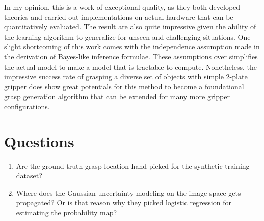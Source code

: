 \documentclass[10pt, twocolumn]{article}
\begin{document}
In my opinion, this is a work of exceptional quality, as they both developed
theories and carried out implementations on actual hardware that can be quantitatively
evaluated. The result are also quite impressive given the ability of the learning algorithm
to generalize for unseen and challenging situations. One slight shortcoming
of this work comes with the independence assumption made in the derivation
of Bayes-like inference formulae. These assumptions over simplifies the
actual model to make a model that is tractable to compute. Nonetheless,
the impressive success rate of grasping a diverse set of objects with simple
2-plate gripper does show great potentials for this method to become a
foundational grasp generation algorithm that can be extended for many more
gripper configurations.

\section{Questions}
\begin{enumerate}
  \item Are the ground truth grasp location hand picked for the synthetic training dataset?
  \item Where does the Gaussian uncertainty modeling on the image space gets
    propagated? Or is that reason why they picked logistic regression for
    estimating the probability map?
\end{enumerate}
\end{document}
